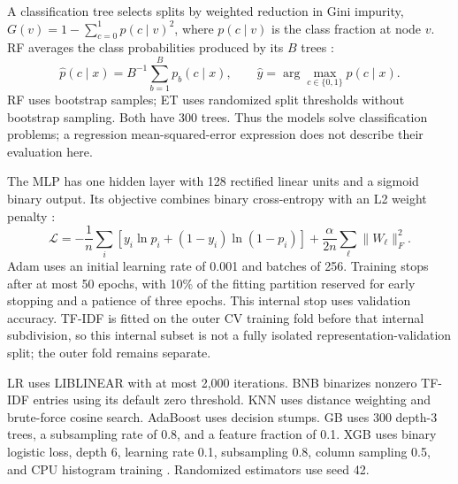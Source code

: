 \documentclass[conference]{IEEEtran}
\begin{document}
A classification tree selects splits by weighted reduction in Gini impurity, $G(v)=1-\sum_{c=0}^{1}p(c\mid v)^2$, where $p(c\mid v)$ is the class fraction at node $v$. RF averages the class probabilities produced by its $B$ trees \cite{breiman,sklearn}:
\begin{equation}
\widehat p(c\mid x)=B^{-1}\sum_{b=1}^{B}p_b(c\mid x),\qquad
\widehat y=\arg\max_{c\in\{0,1\}}\widehat p(c\mid x).
\label{eq:rf}
\end{equation}
RF uses bootstrap samples; ET uses randomized split thresholds without bootstrap sampling. Both have 300 trees. Thus the models solve classification problems; a regression mean-squared-error expression does not describe their evaluation here.

The MLP has one hidden layer with 128 rectified linear units and a sigmoid binary output. Its objective combines binary cross-entropy with an L2 weight penalty \cite{sklearn,mlp}:
\begin{equation}
\mathcal L=-\frac1n\sum_i[y_i\ln p_i+(1-y_i)\ln(1-p_i)]
+\frac{\alpha}{2n}\sum_\ell\|W_\ell\|_F^2.
\label{eq:mlp}
\end{equation}
Adam uses an initial learning rate of 0.001 and batches of 256. Training stops after at most 50 epochs, with 10\% of the fitting partition reserved for early stopping and a patience of three epochs. This internal stop uses validation accuracy. TF-IDF is fitted on the outer CV training fold before that internal subdivision, so this internal subset is not a fully isolated representation-validation split; the outer fold remains separate.

LR uses LIBLINEAR with at most 2,000 iterations. BNB binarizes nonzero TF-IDF entries using its default zero threshold. KNN uses distance weighting and brute-force cosine search. AdaBoost uses decision stumps. GB uses 300 depth-3 trees, a subsampling rate of 0.8, and a feature fraction of 0.1. XGB uses binary logistic loss, depth 6, learning rate 0.1, subsampling 0.8, column sampling 0.5, and CPU histogram training \cite{xgb}. Randomized estimators use seed 42.
\end{document}
